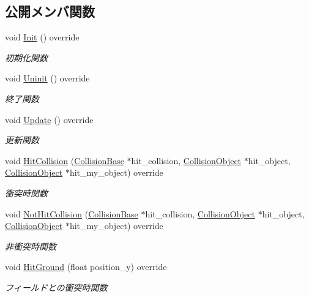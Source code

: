 \subsection*{公開メンバ関数}
\begin{DoxyCompactItemize}
\item 
void \mbox{\hyperlink{class_player_collision_a3dd6238b75933fd60aee77e92353cc44}{Init}} () override
\begin{DoxyCompactList}\small\item\em 初期化関数 \end{DoxyCompactList}\item 
void \mbox{\hyperlink{class_player_collision_aa1ab60a62fa2ae3231a1ea0bc8faf801}{Uninit}} () override
\begin{DoxyCompactList}\small\item\em 終了関数 \end{DoxyCompactList}\item 
void \mbox{\hyperlink{class_player_collision_a09f97f220903f5724a3af6b97af3a336}{Update}} () override
\begin{DoxyCompactList}\small\item\em 更新関数 \end{DoxyCompactList}\item 
void \mbox{\hyperlink{class_player_collision_ad937a5fd226e742270202bf4eff53767}{Hit\+Collision}} (\mbox{\hyperlink{class_collision_base}{Collision\+Base}} $\ast$hit\+\_\+collision, \mbox{\hyperlink{class_collision_object}{Collision\+Object}} $\ast$hit\+\_\+object, \mbox{\hyperlink{class_collision_object}{Collision\+Object}} $\ast$hit\+\_\+my\+\_\+object) override
\begin{DoxyCompactList}\small\item\em 衝突時関数 \end{DoxyCompactList}\item 
void \mbox{\hyperlink{class_player_collision_a21b8f825ea142024212ab5fe3f427ab0}{Not\+Hit\+Collision}} (\mbox{\hyperlink{class_collision_base}{Collision\+Base}} $\ast$hit\+\_\+collision, \mbox{\hyperlink{class_collision_object}{Collision\+Object}} $\ast$hit\+\_\+object, \mbox{\hyperlink{class_collision_object}{Collision\+Object}} $\ast$hit\+\_\+my\+\_\+object) override
\begin{DoxyCompactList}\small\item\em 非衝突時関数 \end{DoxyCompactList}\item 
void \mbox{\hyperlink{class_player_collision_a3522ce17b1e1752f2737c2243582ecb0}{Hit\+Ground}} (float position\+\_\+y) override
\begin{DoxyCompactList}\small\item\em フィールドとの衝突時関数 \end{DoxyCompactList}\end{DoxyCompactItemize}
